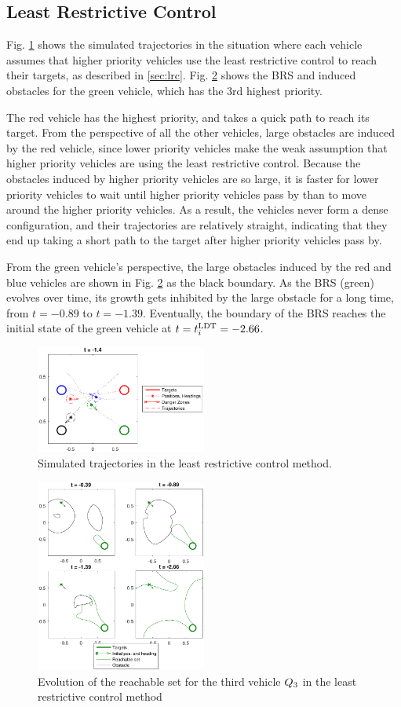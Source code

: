 \subsection{Least Restrictive Control}
Fig. \ref{fig:lrc_traj} shows the simulated trajectories in the situation where each vehicle assumes that higher priority vehicles use the least restrictive control to reach their targets, as described in \ref{sec:lrc}. Fig. \ref{fig:lrc_rs3} shows the BRS and induced obstacles for the green vehicle, which has the 3rd highest priority.

The red vehicle has the highest priority, and takes a quick path to reach its target. From the perspective of all the other vehicles, large obstacles are induced by the red vehicle, since lower priority vehicles make the weak assumption that higher priority vehicles are using the least restrictive control. Because the obstacles induced by higher priority vehicles are so large, it is faster for lower priority vehicles to wait until higher priority vehicles pass by than to move around the higher priority vehicles. As a result, the vehicles never form a dense configuration, and their trajectories are relatively straight, indicating that they end up taking a short path to the target after higher priority vehicles pass by.

From the green vehicle's perspective, the large obstacles induced by the red and blue vehicles are shown in Fig. \ref{fig:lrc_rs3} as the black boundary. As the BRS (green) evolves over time, its growth gets inhibited by the large obstacle for a long time, from $t=-0.89$ to $t=-1.39$. Eventually, the boundary of the BRS reaches the initial state of the green vehicle at $t = t^\text{LDT}_i = -2.66$.

\begin{figure}
  \centering
  \includegraphics[width=0.5\textwidth]{"fig/lrc_traj"}
  \caption{Simulated trajectories in the least restrictive control method.}
  \label{fig:lrc_traj}
\end{figure}

\begin{figure}
  \centering
  \includegraphics[width=0.5\textwidth]{"fig/lrc_rs3"}
  \caption{Evolution of the reachable set for the third vehicle $Q_3$ in the least restrictive control method}
  \label{fig:lrc_rs3}
\end{figure}